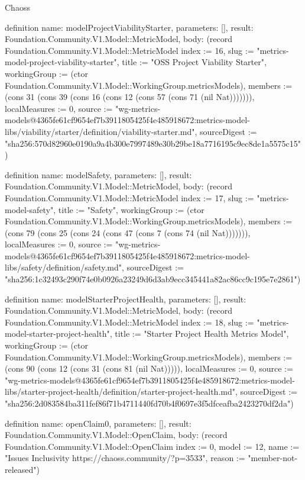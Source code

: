 \begin{lexlean}{Chaoss}
\begin{semanticmodule}
definition{
  name: modelProjectViabilityStarter,
  parameters: [],
  result: Foundation.Community.V1.Model::MetricModel,
  body: (record Foundation.Community.V1.Model::MetricModel {index := 16, slug := "metrics-model-project-viability-starter", title := "OSS Project Viability Starter", workingGroup := (ctor Foundation.Community.V1.Model::WorkingGroup.metricsModels), members := (cons 31 (cons 39 (cons 16 (cons 12 (cons 57 (cons 71 (nil Nat))))))), localMeasures := 0, source := "wg-metrics-models@4365fe61cf9654ef7b3911805425f4e485918672:metrics-model-libs/viability/starter/definition/viability-starter.md", sourceDigest := "sha256:570d82960e0190a9a4b300e7997489e30b29be18a7716195c9ec8de1a5575c15"})
}

definition{
  name: modelSafety,
  parameters: [],
  result: Foundation.Community.V1.Model::MetricModel,
  body: (record Foundation.Community.V1.Model::MetricModel {index := 17, slug := "metrics-model-safety", title := "Safety", workingGroup := (ctor Foundation.Community.V1.Model::WorkingGroup.metricsModels), members := (cons 79 (cons 25 (cons 24 (cons 47 (cons 7 (cons 74 (nil Nat))))))), localMeasures := 0, source := "wg-metrics-models@4365fe61cf9654ef7b3911805425f4e485918672:metrics-model-libs/safety/definition/safety.md", sourceDigest := "sha256:1c32493c290f74e0b0926a23249d6d3ab9ecc345441a82ac86cc9c195e7e2861"})
}

definition{
  name: modelStarterProjectHealth,
  parameters: [],
  result: Foundation.Community.V1.Model::MetricModel,
  body: (record Foundation.Community.V1.Model::MetricModel {index := 18, slug := "metrics-model-starter-project-health", title := "Starter Project Health Metrics Model", workingGroup := (ctor Foundation.Community.V1.Model::WorkingGroup.metricsModels), members := (cons 90 (cons 12 (cons 31 (cons 81 (nil Nat))))), localMeasures := 0, source := "wg-metrics-models@4365fe61cf9654ef7b3911805425f4e485918672:metrics-model-libs/starter-project-health/definition/starter-project-health.md", sourceDigest := "sha256:2d083584ba311fef86f71b4711440fd70b4f0697e3f5dfceafba2423270df2da"})
}

definition{
  name: openClaim0,
  parameters: [],
  result: Foundation.Community.V1.Model::OpenClaim,
  body: (record Foundation.Community.V1.Model::OpenClaim {index := 0, model := 12, name := "Issues Inclusivity https://chaoss.community/?p=3533", reason := "member-not-released"})
}


\end{semanticmodule}
\end{lexlean}
